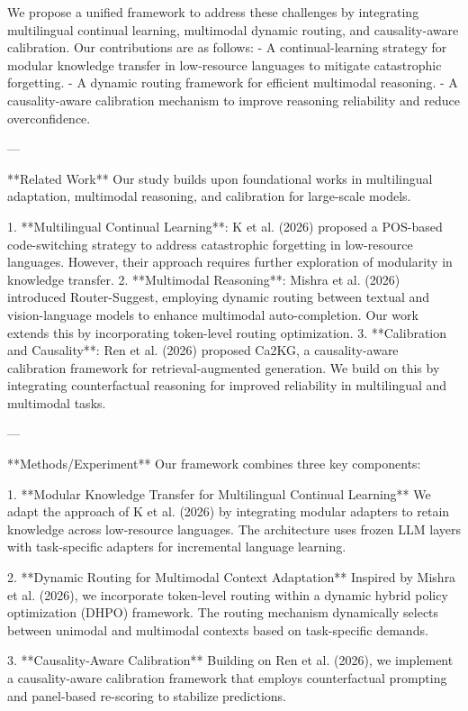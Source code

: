 We propose a unified framework to address these challenges by integrating multilingual continual learning, multimodal dynamic routing, and causality-aware calibration. Our contributions are as follows:  
- A continual-learning strategy for modular knowledge transfer in low-resource languages to mitigate catastrophic forgetting.  
- A dynamic routing framework for efficient multimodal reasoning.  
- A causality-aware calibration mechanism to improve reasoning reliability and reduce overconfidence.  

---

**Related Work**  
Our study builds upon foundational works in multilingual adaptation, multimodal reasoning, and calibration for large-scale models.  

1. **Multilingual Continual Learning**: K et al. (2026) proposed a POS-based code-switching strategy to address catastrophic forgetting in low-resource languages. However, their approach requires further exploration of modularity in knowledge transfer.  
2. **Multimodal Reasoning**: Mishra et al. (2026) introduced Router-Suggest, employing dynamic routing between textual and vision-language models to enhance multimodal auto-completion. Our work extends this by incorporating token-level routing optimization.  
3. **Calibration and Causality**: Ren et al. (2026) proposed Ca2KG, a causality-aware calibration framework for retrieval-augmented generation. We build on this by integrating counterfactual reasoning for improved reliability in multilingual and multimodal tasks.  

---

**Methods/Experiment**  
Our framework combines three key components:  

1. **Modular Knowledge Transfer for Multilingual Continual Learning**  
We adapt the approach of K et al. (2026) by integrating modular adapters to retain knowledge across low-resource languages. The architecture uses frozen LLM layers with task-specific adapters for incremental language learning.  

2. **Dynamic Routing for Multimodal Context Adaptation**  
Inspired by Mishra et al. (2026), we incorporate token-level routing within a dynamic hybrid policy optimization (DHPO) framework. The routing mechanism dynamically selects between unimodal and multimodal contexts based on task-specific demands.  

3. **Causality-Aware Calibration**  
Building on Ren et al. (2026), we implement a causality-aware calibration framework that employs counterfactual prompting and panel-based re-scoring to stabilize predictions.  

